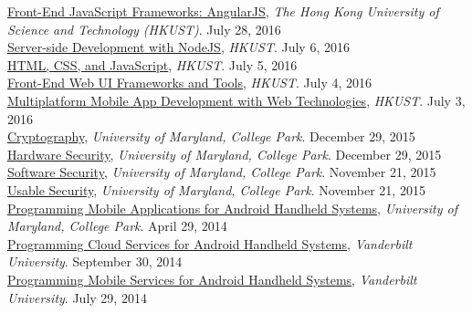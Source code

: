 \documentclass[10pt]{res} %
\begin{document}
\begin{resume}
\href{https://www.coursera.org/account/accomplishments/verify/HDQJESNW743L}{\color{blue}Front-End JavaScript Frameworks: AngularJS}, {\sl The Hong Kong University of Science and Technology (HKUST)}. \hfill July 28, 2016 \\
\href{https://www.coursera.org/account/accomplishments/verify/EC2ETNWXSFFC}{\color{blue}Server-side Development with NodeJS}, {\sl HKUST}. \hfill July 6, 2016 \\
\href{https://www.coursera.org/account/accomplishments/verify/DUM6SPFLLJ7K}{\color{blue}HTML, CSS, and JavaScript}, {\sl HKUST}. \hfill July 5, 2016 \\
\href{https://www.coursera.org/account/accomplishments/verify/A3SVFN9XWVR9}{\color{blue}Front-End Web UI Frameworks and Tools}, {\sl HKUST}. \hfill July 4, 2016 \\
\href{https://www.coursera.org/account/accomplishments/verify/NT946UNLWW47}{\color{blue}Multiplatform Mobile App Development with Web Technologies}, {\sl HKUST}. \hfill July 3, 2016 \\
\href{https://www.coursera.org/account/accomplishments/verify/H3VUSPHKB9}{\color{blue}Cryptography}, {\sl University of Maryland, College Park}. \hfill December 29, 2015 \\
\href{https://www.coursera.org/account/accomplishments/verify/WFF78Q988T}{\color{blue}Hardware Security}, {\sl University of Maryland, College Park}. \hfill December 29, 2015 \\
\href{https://www.coursera.org/account/accomplishments/verify/SPXEUCNL6Y}{\color{blue}Software Security}, {\sl University of Maryland, College Park}. \hfill November 21, 2015 \\
\href{https://www.coursera.org/account/accomplishments/verify/7G3J4BKR5G}{\color{blue}Usable Security}, {\sl University of Maryland, College Park}. \hfill November 21, 2015 \\
\href{https://www.coursera.org/account/accomplishments/verify/2SNMQSXEXA}{\color{blue}Programming Mobile Applications for Android Handheld Systems}, {\sl University of Maryland, College Park}. \hfill April 29, 2014 \\
\href{https://www.coursera.org/account/accomplishments/verify/NJLNZ3K9CE}{\color{blue}Programming Cloud Services for Android Handheld Systems}, {\sl Vanderbilt University}. \hfill September 30, 2014 \\
\href{https://www.coursera.org/account/accomplishments/verify/3FB2AZZPM5}{\color{blue}Programming Mobile Services for Android Handheld Systems}, {\sl Vanderbilt University}. \hfill July 29, 2014


\end{resume}
\end{document}

